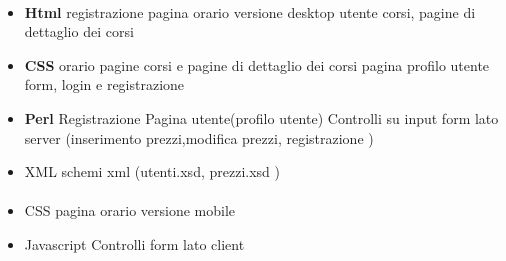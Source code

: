 \documentclass[12pt,a4paper]{article}
\begin{document}
\paragraph{\AB{}}
\begin{itemize}
	\item \textbf{Html}
	\subitem registrazione
	\subitem pagina orario versione desktop
	\subitem utente
	\subitem corsi, pagine di dettaglio dei corsi
	\item \textbf{CSS}
	\subitem orario
	\subitem pagine corsi e pagine di dettaglio dei corsi
	\subitem pagina profilo utente
	\subitem form, login e registrazione
	\item \textbf{Perl}
	\subitem Registrazione
	\subitem Pagina utente(profilo utente)
	\subitem Controlli su input form lato server (inserimento prezzi,modifica prezzi, registrazione )
	\item{XML}
	\subitem schemi xml (utenti.xsd, prezzi.xsd )
\end{itemize}
\paragraph{\EC{}}
\begin{itemize}
	\item{CSS}
	\subitem pagina orario versione mobile
	\item{Javascript}
	\subitem Controlli form lato client
\end{itemize}
\end{document}
